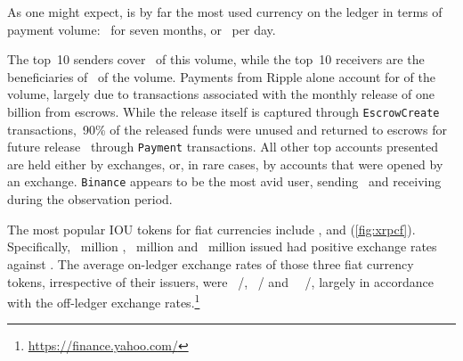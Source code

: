 As one might expect,  is by far the most used currency on the ledger in terms of payment volume:~  for seven months, or~  per day.

The top~10 senders cover~ of this volume, while the top~10 receivers are the beneficiaries of~ of the volume.
Payments from Ripple alone account for  of the  volume, largely due to transactions associated with the monthly release of one billion  from escrows.
While the  release itself is captured through \texttt{EscrowCreate} transactions,~90\% of the released funds were unused and returned to escrows for future release~\cite{TeamRipple} through \texttt{Payment} transactions.
All other top accounts presented are held either by exchanges, or, in rare cases, by accounts that were opened by an exchange.
\texttt{Binance} appears to be the most avid  user, sending~ and receiving~  during the observation period.

The most popular IOU tokens for fiat currencies include ,  and  (\autoref{fig:xrpcf}).
Specifically,~ million ,~ million  and~ million  issued had positive exchange rates against .
The average on-ledger exchange rates of those three fiat currency tokens, irrespective of their issuers, were~ /,~ / and~~ /, largely in accordance with the off-ledger exchange rates.\footnote{\url{https://finance.yahoo.com/}}




